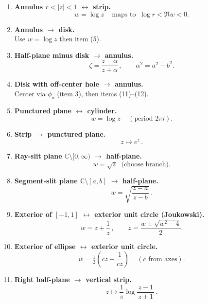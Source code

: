 \documentclass[12pt,a4paper]{article}
\begin{document}
\begin{enumerate}
		\item \textbf{Annulus $r<|z|<1$ $\leftrightarrow$ strip.}\\[2pt]
		\[
		\boxed{\,w=\log z\,}\quad\text{maps to }\ \log r<\Re w<0.
		\]
		
		\item \textbf{Annulus $\to$ disk.}\\[2pt]
		Use $w=\log z$ then item (5).
		
		\item \textbf{Half-plane minus disk $\to$ annulus.}\\[2pt]
		\[
		\boxed{\,\zeta=\frac{z-\alpha}{z+\alpha}\,},\qquad \alpha^{2}=a^{2}-b^{2}.
		\]
		
		\item \textbf{Disk with off-center hole $\to$ annulus.}\\[2pt]
		Center via $\phi_a$ (item 3), then items (11)–(12).
		
		\item \textbf{Punctured plane $\leftrightarrow$ cylinder.}\\[2pt]
		\[
		\boxed{\,w=\log z\,}\quad(\text{period }2\pi i).
		\]
		
		\item \textbf{Strip $\to$ punctured plane.}\\[2pt]
		\[
		\boxed{\,z\mapsto e^{z}\,}.
		\]
		
		\item \textbf{Ray-slit plane $\mathbb C\setminus[0,\infty)$ $\to$ half-plane.}\\[2pt]
		\[
		\boxed{\,w=\sqrt{z}\,}\ \ \text{(choose branch)}.
		\]
		
		\item \textbf{Segment-slit plane $\mathbb C\setminus[a,b]$ $\to$ half-plane.}\\[2pt]
		\[
		\boxed{\,w=\sqrt{\frac{z-a}{\,z-b\,}}\,}.
		\]
		
		\item \textbf{Exterior of $[-1,1]$ $\leftrightarrow$ exterior unit circle (Joukowski).}\\[2pt]
		\[
		\boxed{\,w=z+\frac{1}{z}\,},\qquad
		z=\frac{w\pm\sqrt{w^{2}-4}}{2}.
		\]
		
		\item \textbf{Exterior of ellipse $\leftrightarrow$ exterior unit circle.}\\[2pt]
		\[
		\boxed{\,w=\tfrac12\!\left(c z+\frac{1}{c z}\right)\,}\quad(\text{$c$ from axes}).
		\]
		
		\item \textbf{Right half-plane $\to$ vertical strip.}\\[2pt]
		\[
		\boxed{\,z\mapsto \frac{1}{\pi}\log\frac{z-1}{\,z+1\,}\,}.
		\]
		

\end{enumerate}
\end{document}
